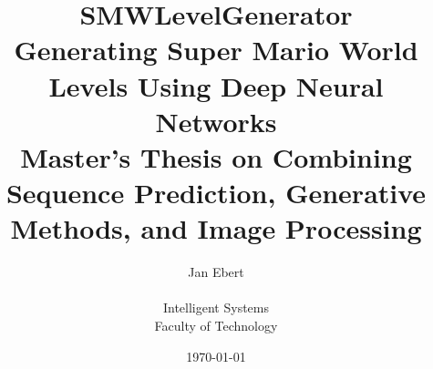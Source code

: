 \documentclass[12pt,a4paper,titlepage]{article} %
\title{SMWLevelGenerator \\
  \Large{Generating Super Mario World Levels Using Deep Neural Networks} \\
  \bigskip
  \large{Master's Thesis on Combining Sequence Prediction,
    Generative Methods, and Image Processing}}
\author{Jan Ebert \smallskip \\ \\
  \small{Intelligent Systems} \\
  \small{Faculty of Technology}}
\date{\today}
\begin{document}









\raggedright
\printbibliography
\end{document}
